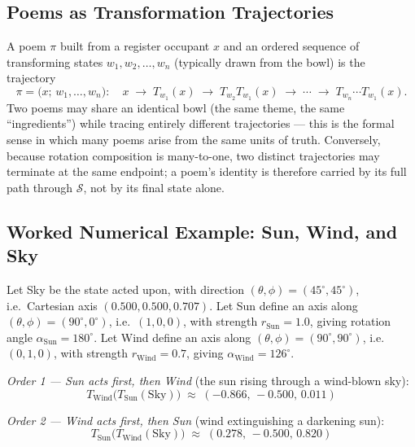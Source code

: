 \documentclass[12pt, a4paper]{article}
\begin{document}
\subsection{Poems as Transformation Trajectories}
\label{subsec:transform_trajectories}
A poem $\pi$ built from a register occupant $x$ and an ordered sequence of
transforming states $w_1, w_2, \ldots, w_n$ (typically drawn from the bowl) is the trajectory
\begin{equation}
    \pi = \big(x;\, w_1, \ldots, w_n\big): \quad
    x \;\longrightarrow\; T_{w_1}(x) \;\longrightarrow\; T_{w_2}T_{w_1}(x) \;\longrightarrow\; \cdots \;\longrightarrow\; T_{w_n}\cdots T_{w_1}(x).
    \label{eq:poem_trajectory}
\end{equation}
Two poems may share an identical bowl (the same theme, the
same ``ingredients'') while tracing entirely different trajectories
--- this is the formal sense in which many poems arise from the same
units of truth. Conversely, because rotation composition is
many-to-one, two distinct trajectories may terminate at the same
endpoint; a poem's identity is therefore carried by its full path
through $\mathcal{S}$, not by its final state alone.

\subsection{Worked Numerical Example: Sun, Wind, and Sky}
\label{subsec:transform_example}
Let Sky be the state acted upon, with direction
$(\theta,\phi) = (45^\circ, 45^\circ)$, i.e.\ Cartesian axis
$(0.500, 0.500, 0.707)$. Let Sun define an axis along
$(\theta,\phi) = (90^\circ, 0^\circ)$, i.e.\ $(1,0,0)$, with strength
$r_{\text{Sun}} = 1.0$, giving rotation angle $\alpha_{\text{Sun}} =
180^\circ$. Let Wind define an axis along $(\theta,\phi) = (90^\circ,
90^\circ)$, i.e.\ $(0,1,0)$, with strength $r_{\text{Wind}} = 0.7$,
giving $\alpha_{\text{Wind}} = 126^\circ$.

\emph{Order 1 --- Sun acts first, then Wind} (the sun rising through a
wind-blown sky):
\begin{equation}
    T_{\text{Wind}}\big(T_{\text{Sun}}(\text{Sky})\big) \;\approx\; (-0.866,\, -0.500,\, 0.011)
\end{equation}

\emph{Order 2 --- Wind acts first, then Sun} (wind extinguishing a
darkening sun):
\begin{equation}
    T_{\text{Sun}}\big(T_{\text{Wind}}(\text{Sky})\big) \;\approx\; (0.278,\, -0.500,\, 0.820)
\end{equation}
\end{document}
